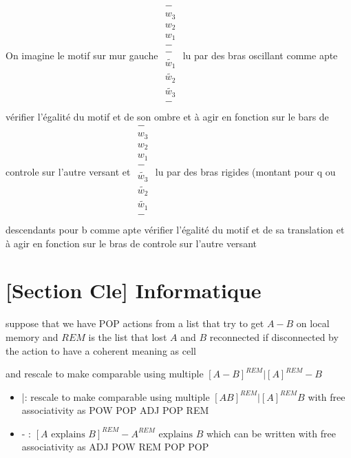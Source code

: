 \documentclass{article}
\begin{document}
   On imagine le motif sur mur gauche  
    $\begin{matrix}
    -\\
    w_3\\
w_2 \\
w_1\\
-\\
-\\
\tilde{w_1}\\
\tilde{w_2}\\
\tilde{w_3}\\
-\\
\end{matrix}$ lu par des bras oscillant comme apte  vérifier l'égalité du motif et de son ombre  et à agir en fonction sur le bars de controle sur l'autre versant
et  $\begin{matrix}
-\\
    w_3\\
w_2 \\
w_1\\
-\\
\tilde{w_3}\\
\tilde{w_2}\\
\tilde{w_1}\\
-\\
\end{matrix}$ lu par des bras rigides (montant pour q ou descendants pour b   comme apte  vérifier l'égalité du motif et de sa translation   et à agir en fonction sur le bras de controle sur l'autre versant
  
 
\section{ [Section Cle] Informatique }
suppose that we have  POP actions from a list that try to get  $A -  B$  on local memory   and $REM$ is the list that lost $A$ and $B$ reconnected if disconnected by the action to have a coherent meaning as cell

and  rescale to make comparable using multiple $ [A-B]^{REM} |  [A]^{REM}-B$ 

\begin{itemize}
\item |:  rescale to make comparable using multiple $ [AB]^{REM} |  [A]^{REM}B$  with free associativity as  
\subitem POW POP ADJ POP REM
\item - :    $[A \text{ explains } B]^{REM} -A^{REM} \text{ explains } B$  which can be written with free associativity as 
\subitem ADJ POW REM POP POP
\end{itemize}
\end{document}
